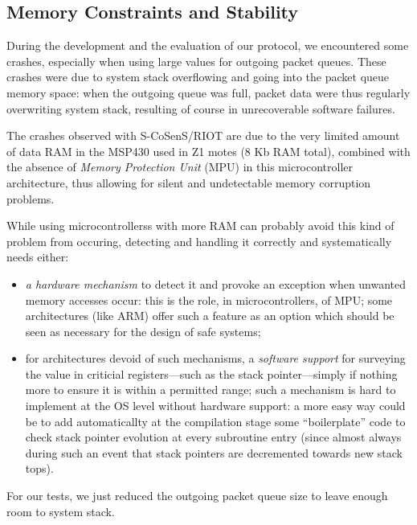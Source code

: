 \documentclass[12pt,a4paper]{article}
\begin{document}

\subsection{Memory Constraints and Stability}

During the development and the evaluation of our protocol, we encountered
some crashes, especially when using large values for outgoing packet queues.
These crashes were due to system stack overflowing and going into the
packet queue memory space: when the outgoing queue was full, packet data
were thus regularly overwriting system stack, resulting of course in
unrecoverable software failures.

\begin{observ}
The crashes observed with S-CoSenS/RIOT are due to the very limited
amount of data RAM in the MSP430 used in Z1 motes (8 Kb RAM total),
combined with the absence of \emph{Memory Protection Unit} (MPU) in this
microcontroller architecture, thus allowing for silent and undetectable
memory corruption problems.
\end{observ}

While using microcontrollerss with more RAM can probably avoid this kind of
problem from occuring, detecting and handling it correctly and systematically
needs either:
\begin{itemize}
\item \emph{a hardware mechanism} to detect it and provoke an exception when
      unwanted memory accesses occur: this is the role, in microcontrollers,
      of MPU; some architectures (like ARM) offer such a feature as an option
      which should be seen as necessary for the design of safe systems;
\item for architectures devoid of such mechanisms, a \emph{software support}
      for surveying the value in criticial registers---such as the stack
      pointer---simply if nothing more to ensure it is within a permitted
      range; such a mechanism is hard to implement at the OS level without
      hardware support: a more easy way could be to add automaticallty at the
      compilation stage some ``boilerplate'' code to check stack pointer
      evolution at every subroutine entry (since almost always during such an
      event that stack pointers are decremented towards new stack tops).
\end{itemize}

For our tests, we just reduced the outgoing packet queue size to leave
enough room to system stack.
\end{document}
